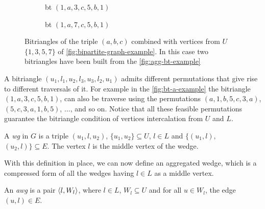 \begin{figure}[h!]
\begin{subfigure}[b]{0.5\textwidth}
\centering
{}
\caption{\acrshort{bt} $(1,a,3,c,5,b,1)$}
\end{subfigure}
\begin{subfigure}[b]{0.5\textwidth}
\centering
{}
\caption{\acrshort{bt} $(1,a,7,c,5,b,1)$}
\end{subfigure}
\caption[{[\acrshort{iebt}] Example of bitriangles}]{Bitriangles of the triple $(a,b,c)$ combined with vertices from $U$ $\{1,3,5,7\}$ of \autoref{fig:bipartite-graph-example}. In this case two bitriangles have been built from the \autoref{fig:agg-bt-example}}
\label{fig:bt-a-example}
\end{figure}

A bitriangle $(u_1,l_1,u_2,l_3,u_3,l_2,u_1)$ admits different permutations that give rise to different traversals of it. 
For example in the \autoref{fig:bt-a-example} the bitriangle $(1,a,3,c,5,b,1)$, can also be traverse using the permutations $(a,1,b,5,c,3,a)$, $(5,c,3,a,1,b,5)$, $\dots$, and so on.
Notice that all these feasible permutations guarantee the bitriangle condition of vertices intercalation from $U$ and $L$.

\begin{definition}[\acrfull{wg}]\label{def:wg}
A \textit{\acrfull{wg}} in $G$ is a triple $(u_1,l,u_2)$, $\{u_1,u_2\}\subseteq U$, $l \in L$ and $\{(u_1,l),$ $(u_2,l)\} \subseteq E$. The vertex $l$ is the middle vertex of the wedge. 
\end{definition}

With this definition in place, we can now define an aggregated wedge, which is a compressed form of all the wedges having $l \in L$ as a middle vertex.
      
\begin{definition}\label{def:awg}
An \textit{\acrfull{awg}} is a pair $\left\langle l, W_l \right\rangle$, where $l \in L$, $W_l \subseteq U$ and for all $u\in W_l$, the edge  $(u,l)\in E$. 
\end{definition}

